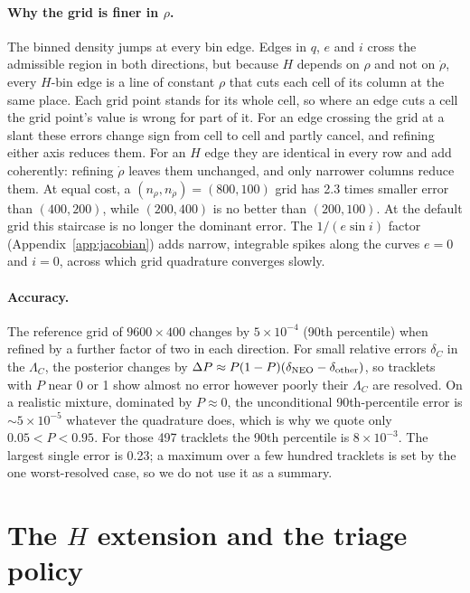 \documentclass[linenumbers,twocolumn]{aastex701}
\begin{document}
\paragraph{Why the grid is finer in $\rho$.}
The binned density jumps at every bin edge. Edges in $q$, $e$ and $i$ cross
the admissible region in both directions, but because $H$ depends on $\rho$
and not on $\dot\rho$, every $H$-bin edge is a line of constant $\rho$ that
cuts each cell of its column at the same place. Each grid point stands for its
whole cell, so where an edge cuts a cell the grid point's value is wrong for part of
it. For an edge crossing the grid at a slant these errors change sign from
cell to cell and partly cancel, and refining either axis reduces them. For an
$H$ edge they are identical in every row and add coherently: refining
$\dot\rho$ leaves them unchanged, and only narrower columns reduce them. At
equal cost, a $(n_\rho,n_{\dot\rho})=(800,100)$ grid has 2.3 times smaller
error than $(400,200)$, while $(200,400)$ is no better than $(200,100)$. At
the default grid this staircase is no longer the dominant error. The
$1/(e\sin i)$ factor (Appendix~\ref{app:jacobian}) adds narrow, integrable
spikes along the curves $e=0$ and $i=0$, across which grid quadrature
converges slowly.

\paragraph{Accuracy.}
The reference grid of $9600\times400$ changes by $5\times10^{-4}$ (90th
percentile) when refined by a further factor of two in each direction. For
small relative errors $\delta_C$ in the $\Lambda_C$, the posterior changes by
$\Delta P\approx P(1-P)(\delta_{\rm NEO}-\delta_{\rm other})$, so tracklets
with $P$ near 0 or 1 show almost no error however poorly their $\Lambda_C$ are
resolved. On a realistic mixture, dominated by $P\approx0$, the
unconditional 90th-percentile error is $\sim5\times10^{-5}$ whatever the
quadrature does, which is why we quote only $0.05<P<0.95$. For those 497
tracklets the 90th percentile is $8\times10^{-3}$. The largest single error is
0.23; a maximum over a few hundred tracklets is set by the one worst-resolved
case, so we do not use it as a summary.

\section{The $H$ extension and the triage policy}
\label{app:truncation}
\end{document}
